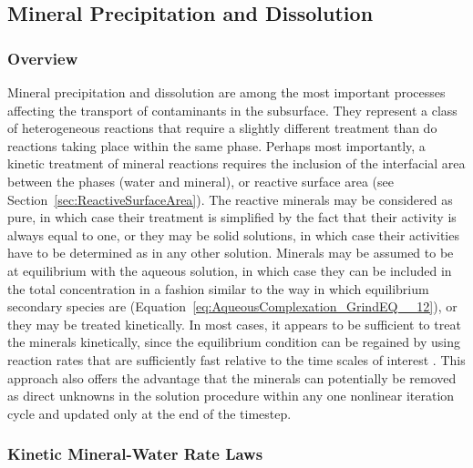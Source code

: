 
\subsection{Mineral Precipitation and Dissolution} 
\label{sec:mineralPrecipDissolution}

\subsubsection{Overview} 

Mineral precipitation and dissolution are among the most important
processes affecting the transport of contaminants in the subsurface.
They represent a class of heterogeneous reactions that require a
slightly different treatment than do reactions taking place within the
same phase.  Perhaps most importantly, a kinetic treatment of mineral
reactions requires the inclusion of the interfacial area between the
phases (water and mineral), or reactive surface area (see
Section~\ref{sec:ReactiveSurfaceArea}).  The reactive minerals may be
considered as pure, in which case their treatment is simplified by the
fact that their activity is always equal to one, or they may be solid
solutions, in which case their activities have to be determined as in
any other solution.  Minerals may be assumed to be at equilibrium with
the aqueous solution, in which case they can be included in the total
concentration in a fashion similar to the way in which equilibrium
secondary species are (Equation~\eqref{eq:AqueousComplexation_GrindEQ__12}), 
or they may be treated kinetically.  In most cases, it appears to be sufficient to
treat the minerals kinetically, since the equilibrium condition can be
regained by using reaction rates that are sufficiently fast relative
to the time scales of interest \citep{steefel_1996}.  This approach
also offers the advantage that the minerals can potentially be removed
as direct unknowns in the solution procedure within any one nonlinear
iteration cycle and updated only at the end of the timestep.

\subsubsection{Kinetic Mineral-Water Rate Laws}


